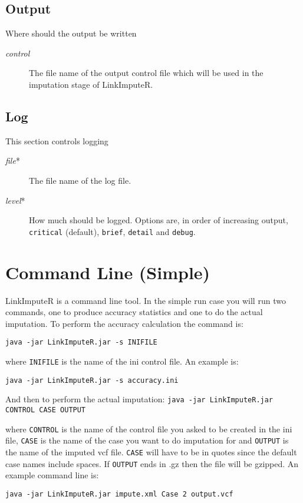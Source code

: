 \documentclass[10pt]{report}
\begin{document}
\subsection{Output}
Where should the output be written
\begin{description}
\item[\emph{control}] The file name of the output control file which will be used in the imputation stage of LinkImputeR.
\end{description}

\subsection{Log}
This section controls logging
\begin{description}
\item[\emph{file}*] The file name of the log file.
\item[\emph{level}*] How much should be logged.  Options are, in order of increasing output, \texttt{critical} (default), \texttt{brief}, \texttt{detail} and \texttt{debug}.
\end{description}

\section{Command Line (Simple)}
\label{sec:command}

LinkImputeR is a command line tool.  In the simple run case you will run two commands, one to produce accuracy statistics and one to do the actual imputation.  To perform the accuracy calculation the command is:

\texttt{java -jar LinkImputeR.jar -s INIFILE}

where \texttt{INIFILE} is the name of the ini control file.  An example is:

\texttt{java -jar LinkImputeR.jar -s accuracy.ini}

And then to perform the actual imputation:
\texttt{java -jar LinkImputeR.jar CONTROL CASE OUTPUT}

where \texttt{CONTROL} is the name of the control file you asked to be created in the ini file, \texttt{CASE} is the name of the case you want to do imputation for and \texttt{OUTPUT} is the name of the imputed vcf file.  \texttt{CASE} will have to be in quotes since the default case names include spaces.  If \texttt{OUTPUT} ends in .gz then the file will be gzipped.  An example command line is:

\texttt{java -jar LinkImputeR.jar impute.xml \textquotesingle Case 2\textquotesingle~output.vcf}
\end{document}
